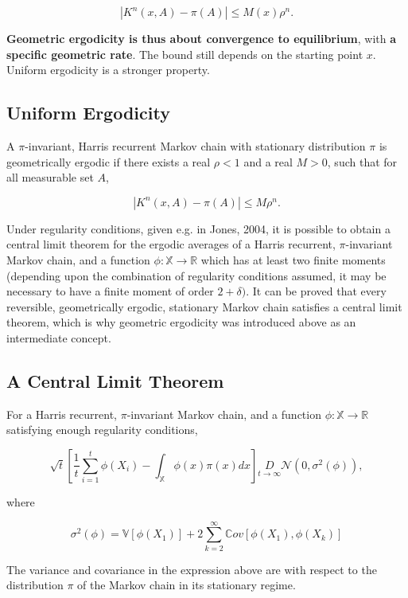 \documentclass[10pt]{article}
\begin{document}
$$
\left|K^{n}(x, A)-\pi(A)\right| \leq M(x) \rho^{n} .
$$

\textbf{Geometric ergodicity is thus about convergence to equilibrium}, with \textbf{a specific geometric rate}. The bound still depends on the starting point $x$. Uniform ergodicity is a stronger property.

\subsection{Uniform Ergodicity}
 A $\pi$-invariant, Harris recurrent Markov chain with stationary distribution $\pi$ is geometrically ergodic if there exists a real $\rho<1$ and a real $M>0$, such that for all measurable set $A$,

$$
\left|K^{n}(x, A)-\pi(A)\right| \leq M \rho^{n} .
$$

Under regularity conditions, given e.g. in Jones, 2004, it is possible to obtain a central limit theorem for the ergodic averages of a Harris recurrent, $\pi$-invariant Markov chain, and a function $\phi: \mathbb{X} \rightarrow \mathbb{R}$ which has at least two finite moments (depending upon the combination of regularity conditions assumed, it may be necessary to have a finite moment of order $2+\delta)$. It can be proved that every reversible, geometrically ergodic, stationary Markov chain satisfies a central limit theorem, which is why geometric ergodicity was introduced above as an intermediate concept.

\subsection{A Central Limit Theorem} For a Harris recurrent, $\pi$-invariant Markov chain, and a function $\phi: \mathbb{X} \rightarrow \mathbb{R}$ satisfying enough regularity conditions,

$$
\sqrt{t}\left[\frac{1}{t} \sum_{i=1}^{t} \phi\left(X_{i}\right)-\int_{\mathbb{X}} \phi(x) \pi(x) d x\right] \underset{t \rightarrow \infty}{D} \mathcal{N}\left(0, \sigma^{2}(\phi)\right),
$$

where

$$
\sigma^{2}(\phi)=\mathbb{V}\left[\phi\left(X_{1}\right)\right]+2 \sum_{k=2}^{\infty} \mathbb{C} o v\left[\phi\left(X_{1}\right), \phi\left(X_{k}\right)\right]
$$

The variance and covariance in the expression above are with respect to the distribution $\pi$ of the Markov chain in its stationary regime.
\end{document}
